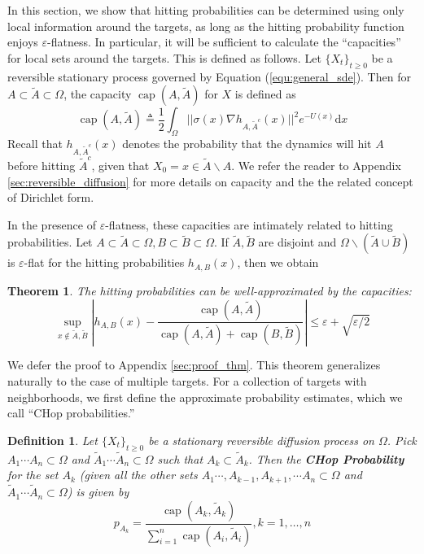 \documentclass[english, aip, jcp, priprint, graphicx,floatfix]{revtex4-1}
\newtheorem{definition}{Definition}
\newtheorem{theorem}{Theorem}
\theoremstyle{plain}
\theoremstyle{definition}
\theoremstyle{plain}
\begin{document}
In this section, we show that hitting probabilities can be determined using only local information around the targets, as long as the hitting probability function enjoys $\varepsilon$-flatness.  In particular, it will be sufficient to calculate the ``capacities'' for local sets around the targets.  This is defined as follows.  Let $\{X_t\}_{t\geq 0}$ be a reversible stationary process governed by Equation (\ref{equ:general_sde}).  Then for $A \subset \tilde{A} \subset \Omega$, the capacity $\ensuremath{\operatorname{cap}} (A, \tilde{A})$ for $X$ is defined as
%
\[ \ensuremath{\operatorname{cap}} (A, \tilde{A}) \triangleq \frac{1}{2} \int_{\Omega}
||\sigma(x) \nabla h_{A, \tilde{A}^c}(x)||^2 e^{- U(x)} \mathrm{d} x \]
%
Recall that $h_{A, \tilde{A}^c}(x)$ denotes the probability that the dynamics will hit $A$ before hitting $\tilde{A}^c$, given that $X_0=x \in \tilde A\backslash A$.  We refer the reader to Appendix \ref{sec:reversible_diffusion} for more details on capacity and the the related concept of Dirichlet form.

In the presence of $\varepsilon$-flatness, these capacities are intimately related to hitting probabilities.  Let $A\subset\tilde A\subset\Omega,B\subset\tilde B\subset\Omega$.  If $\tilde A,\tilde B$ are disjoint and $\Omega \backslash (\tilde A \cup \tilde B)$ is $\varepsilon$-flat for the hitting probabilities $h_{A,B}(x)$, then we obtain

\begin{theorem}\label{thm:main_thm}  The hitting probabilities can be well-approximated by the capacities:
\[ \sup_{x \notin \tilde A,\tilde B} \left| h_{A,B} (x) - \frac{\ensuremath{\operatorname{cap}} (A,
\tilde{A})}{\ensuremath{\operatorname{cap}} (A, \tilde{A})
+\ensuremath{\operatorname{cap}} (B, \tilde{B})} \right| \leqslant \varepsilon + \sqrt{\varepsilon/2} \]
\end{theorem}

We defer the proof to Appendix \ref{sec:proof_thm}. This theorem generalizes naturally to the case of multiple targets.  For a collection of targets with neighborhoods, we first define the approximate probability estimates, which we call ``CHop probabilities.''

\begin{definition}
Let $\{X_t\}_{t\geq 0}$ be a stationary reversible diffusion process on $\Omega$.  Pick $A_1\cdots A_n \subset \Omega$ and $\tilde A_1\cdots \tilde A_n \subset \Omega$ such that $A_k \subset \tilde A_k$.  Then the \textbf{CHop Probability} for the set $A_k$ (given all the other sets $A_1\cdots, A_{k-1}, A_{k+1}, \cdots A_n \subset \Omega$ and $\tilde A_1\cdots \tilde A_n \subset \Omega$) is given by
\begin{equation*}
p_{A_k} = \frac{\ensuremath{\operatorname{cap}} (A_k, \tilde{A}_k)}{\sum_{i = 1}^n \ensuremath{\operatorname{cap}} (A_i, \tilde{A}_i)}, k=1,\dots, n
\end{equation*} 
\end{definition}
\end{document}
